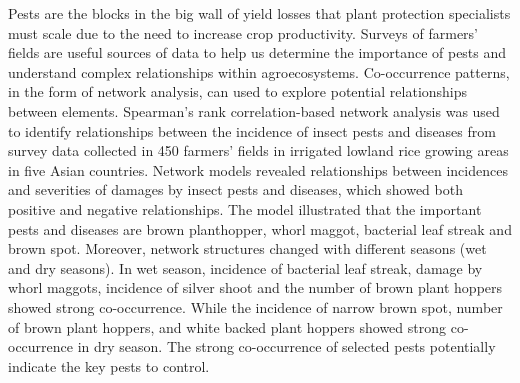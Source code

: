 \documentclass[12pt,a4paper]{article}
\begin{document}
%
%
%
%
Pests are the blocks in the big wall of yield losses that plant protection specialists must scale due to the need to increase crop productivity. Surveys of farmers' fields are useful sources of data to help us determine the importance of pests and understand complex relationships within agroecosystems. Co-occurrence patterns, in the form of network analysis, can used to explore potential relationships between elements. Spearman's rank correlation-based network analysis was used to identify relationships between the incidence of insect pests and diseases from survey data collected in 450 farmers' fields in irrigated lowland rice growing areas in five Asian countries. Network models revealed relationships between incidences and severities of damages by insect pests and diseases, which showed both positive and negative relationships. The model illustrated that the important pests and diseases are brown planthopper, whorl maggot, bacterial leaf streak and brown spot. Moreover, network structures changed with different seasons (wet and dry seasons). In wet season, incidence of bacterial leaf streak, damage by whorl maggots, incidence of silver shoot and the number of brown plant hoppers showed strong co-occurrence. While the incidence of narrow brown spot, number of brown plant hoppers, and white backed plant hoppers showed strong co-occurrence in dry season. The strong co-occurrence of selected pests potentially indicate the key pests to control.
 
\end{document}
